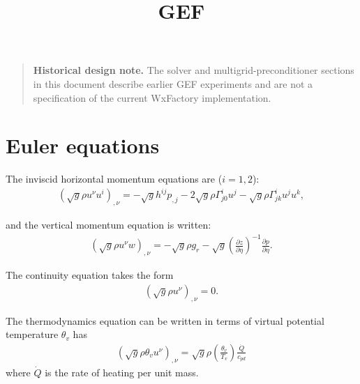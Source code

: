 \documentclass{article}
\title{GEF}
\begin{document}
\maketitle

\begin{quote}
\textbf{Historical design note.} The solver and multigrid-preconditioner sections in this
document describe earlier GEF experiments and are not a specification of the current WxFactory
implementation.
\end{quote}

\section{Euler equations}

The inviscid horizontal momentum equations are ($i=1,2$):
\begin{align}
\left( \sqrt{g}\rho u^\nu u^i\right)_{,\nu} = - \sqrt{g}h^{ij}p_{,j} -2\sqrt{g} \rho \Gamma^i_{j0} u^j - \sqrt{g} \rho \Gamma^i_{jk}u^ju^k,
\end{align}

and the vertical momentum equation is written:
\begin{align}
\left(\sqrt{g}\rho u^\nu w\right)_{,\nu}=-\sqrt{g}\rho g_r-\sqrt{g} \left(\frac{\partial z}{\partial \eta}\right)^{-1} \frac{\partial p}{\partial\eta}.
\end{align}

The continuity equation takes the form
\begin{align}
\left( \sqrt{g}\rho u^\nu \right)_{,\nu} = 0.
\end{align}

The thermodynamics equation can be written in terms of virtual potential temperature $\theta_v$ has
\begin{align}
   \left( \sqrt{g}\rho \theta_v u^\nu \right)_{,\nu} = \sqrt{g} \rho \left( \frac{\theta_v}{T_v} \right) \frac{\dot{Q}}{c_{pd}}
\end{align}
where $\dot{Q}$ is the rate of heating per unit mass.
\end{document}
